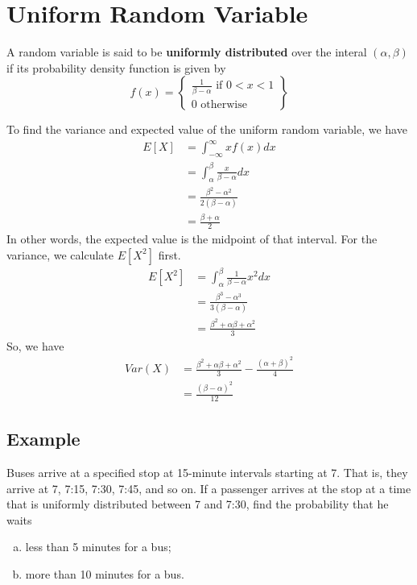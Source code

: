\section{Uniform Random Variable}
\begin{definition}
    A random variable is said to be \textbf{uniformly distributed} over the interal $(\alpha,\beta)$ if its probability density function is given by 
    \begin{equation*}
        f(x) =
        \left\{
            \begin{array}{lr}
                \frac{1}{\beta - \alpha} \text{ if } 0 < x < 1\\
                0 \text{ otherwise}
            \end{array}
        \right\}
    \end{equation*}
\end{definition}
To find the variance and expected value of the uniform random variable, we have 
\begin{equation*}
    \begin{split}
        E[X] &= \int^\infty_{-\infty} xf(x) dx\\
        &= \int^\beta_\alpha \frac{x}{\beta - \alpha} dx\\
        &= \frac{\beta^2 - \alpha^2}{2(\beta - \alpha)}\\
        &= \frac{\beta + \alpha}{2}
    \end{split}
\end{equation*}
In other words, the expected value is the midpoint of that interval. 
For the variance, we calculate $E[X^2]$ first. 
\begin{equation*}
    \begin{split}
        E[X^2] &= \int^\beta_\alpha \frac{1}{\beta - \alpha}x^2 dx\\
        &= \frac{\beta^3 - \alpha^3}{3(\beta - \alpha)}\\
        &= \frac{\beta^2 + \alpha\beta + \alpha^2}{3}
    \end{split}
\end{equation*}
So, we have 
\begin{equation*}
    \begin{split}
        Var(X) &= \frac{\beta^2 + \alpha\beta + \alpha^2}{3} - \frac{(\alpha + \beta)^2}{4}\\
        &= \frac{(\beta - \alpha)^2}{12}
    \end{split}
\end{equation*}
\subsection*{Example}
Buses arrive at a specified stop at 15-minute intervals starting at 7. That is,
they arrive at 7, 7:15, 7:30, 7:45, and so on. If a passenger arrives at the stop at
a time that is uniformly distributed between 7 and 7:30, find the probability that he
waits
\begin{enumerate}[a. ]
    \item less than 5 minutes for a bus;
    \item more than 10 minutes for a bus. 
\end{enumerate}
